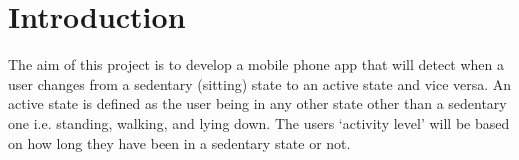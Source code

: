 \chapter{Introduction} %
\label{cha:introduction}

The aim of this project is to develop a mobile phone app that will detect when a user changes from a sedentary (sitting) state to an active state and vice versa. An active state is defined as the user being in any other state other than a sedentary one i.e. standing, walking, and lying down. The users `activity level' will be based on how long they have been in a sedentary state or not.

 


